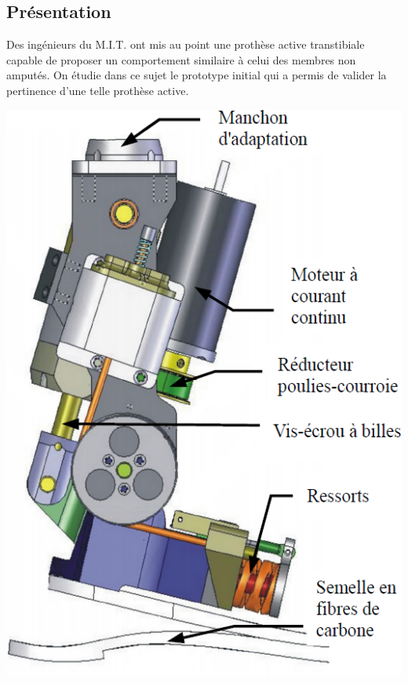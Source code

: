 \documentclass[10pt,fleqn]{article} %
\begin{document}

\vspace{4.5cm}
\pagestyle{fancy}
\thispagestyle{plain}

\def\columnseprulecolor{\color{ocre}}
\setlength{\columnseprule}{0.4pt} 

\def\pathfig{images}

\begin{multicols}{2}

\subsection*{Présentation}

Des ingénieurs du M.I.T. ont mis au point une prothèse active transtibiale capable de proposer un comportement
similaire à celui des membres non amputés. On étudie dans ce sujet le prototype initial
qui a permis de valider la pertinence d'une telle prothèse active.


\begin{center}
\includegraphics[width=.5\linewidth]{images/ccmp_05}


\end{center}
\end{multicols}
\end{document}
